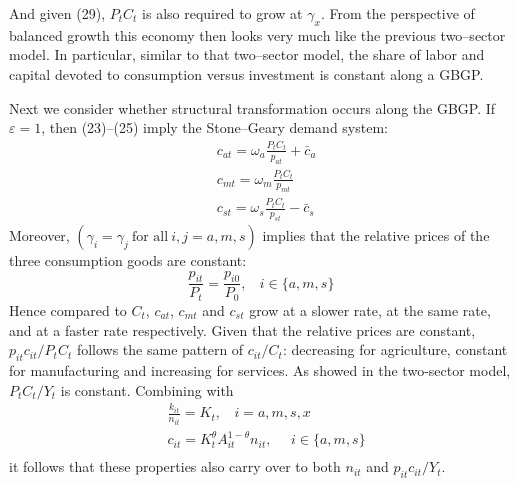 \documentclass{article}
\begin{document}
    And given (29), $P_tC_t$ is also required to grow at $\gamma_x$. From the perspective of balanced growth this economy then looks very much like the previous two–sector model. In particular, similar to that two–sector model, the share of labor and capital devoted to consumption versus investment is constant along a GBGP.

    Next we consider whether structural transformation occurs along the GBGP. If $\varepsilon=1$, then (23)–(25) imply the Stone–Geary demand system:
    \begin{align}
        &c_{at}=\omega_a \frac{P_tC_t}{p_{at}} + \bar{c}_a\\
        &c_{mt}=\omega_m \frac{P_tC_t}{p_{mt}}\\
        &c_{st}=\omega_s \frac{P_tC_t}{p_{st}} - \bar{c}_s
    \end{align}
    Moreover, $(\gamma_i = \gamma_j\ \text{for all}\ i, j = a, m, s)$ implies that the relative prices of the three consumption goods are constant:
    \begin{equation*}
        \frac{p_{it}}{P_t}=\frac{p_{i0}}{P_0},\ \ \ \ i\in\{a,m,s\}
    \end{equation*}
    Hence compared to $C_t$, $c_{at}$, $c_{mt}$ and $c_{st}$ grow at a slower rate, at the same rate, and at a faster rate respectively. Given that the relative prices are constant, $p_{it}c_{it}/P_tC_t$ follows the same pattern of $c_{it}/C_t$: decreasing for agriculture, constant for manufacturing and increasing for services. As showed in the two-sector model, $P_tC_t/Y_t$ is constant. Combining with 
    \begin{align*}
        &\frac{k_{it}}{n_{it}}=K_t,\ \ \ \ i=a,m,s,x\\
        &c_{it}=K_t^\theta A_{it}^{1-\theta} n_{it},\ \ \ \ \ \ i \in \{a,m,s\}\\
    \end{align*}
    it follows that these properties also carry over to both $n_{it}$ and $p_{it}c_{it}/Y_t$.
\end{document}
